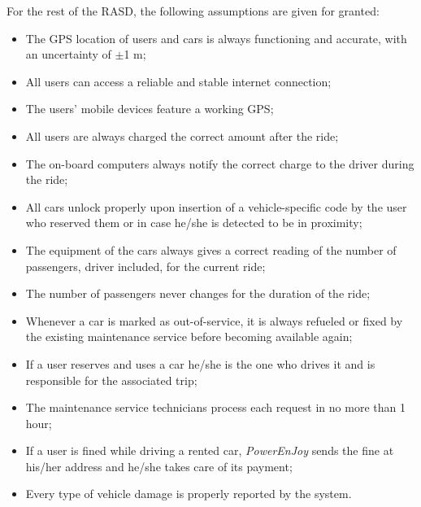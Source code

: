 For the rest of the RASD, the following assumptions are given for granted:

\begin{itemize}
\item The GPS location of users and cars is always functioning and accurate, with an uncertainty of $\pm$1 m; 
\item All users can access a reliable and stable internet connection;
\item The users' mobile devices feature a working GPS;
\item All users are always charged the correct amount after the ride;
\item The on-board computers always notify the correct charge to the driver during the ride;
\item All cars unlock properly upon insertion of a vehicle-specific code by the user who reserved them or in case he/she is detected to be in proximity;
\item The equipment of the cars always gives a correct reading of the number of passengers, driver included, for the current ride;
\item The number of passengers never changes for the duration of the ride;
\item Whenever a car is marked as out-of-service, it is always refueled or fixed by the existing maintenance service before becoming available again;
\item If a user reserves and uses a car he/she is the one who drives it and is responsible for the associated trip;
\item The maintenance service technicians process each request in no more than 1 hour;
\item If a user is fined while driving a rented car, \emph{PowerEnJoy} sends the fine at his/her address and he/she takes care of its payment;
\item Every type of vehicle damage is properly reported by the system.
\end{itemize}